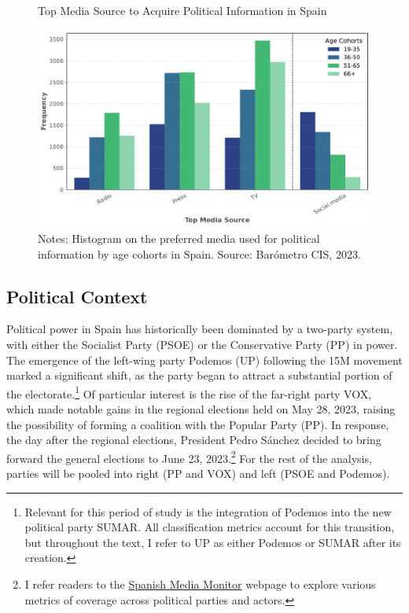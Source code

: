 \documentclass[12pt]{article}
\begin{document}
	\begin{figure}[h!]
		\centering
		\caption{Top Media Source to Acquire Political Information in Spain}
		\includegraphics[width=120mm]{figures/age_cohorts}
\caption*{\small Notes: Histogram on the preferred media used for political information by age cohorts in Spain.  
	Source: Barómetro CIS, 2023. }
\label{fig:motivation}
	\end{figure}
	
	

	
	
	\subsection*{Political Context}
	
	Political power in Spain has historically been dominated by a two-party system, with either the Socialist Party (PSOE) or the Conservative Party (PP) in power. The emergence of the left-wing party Podemos (UP) following the 15M movement marked a significant shift, as the party began to attract a substantial portion of the electorate.\footnote{Relevant for this period of study is the integration of Podemos into the new political party SUMAR. All classification metrics account for this transition, but throughout the text, I refer to UP as either Podemos or SUMAR after its creation.} Of particular interest is the rise of the far-right party VOX, which made notable gains in the regional elections held on May 28, 2023, raising the possibility of forming a coalition with the Popular Party (PP). In response, the day after the regional elections, President Pedro Sánchez decided to bring forward the general elections to June 23, 2023.\footnote{I refer readers to the \href{https://luisignaciomenendez.github.io/media_monitor/index.html}{Spanish Media Monitor} webpage to explore various metrics of coverage across political parties and actors.} For the rest of the analysis, parties will be pooled into right (PP and VOX) and left (PSOE and Podemos).
	
\end{document}
